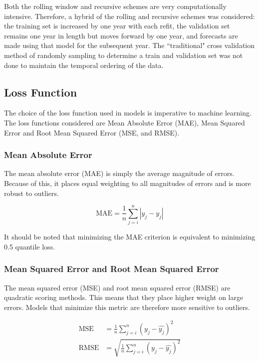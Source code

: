 \documentclass[a4paper, table]{article}
\begin{document}
Both the rolling window and recursive schemes are very computationally intensive. Therefore, a hybrid of the rolling and recursive schemes was considered: the training set is increased by one year with each refit, the validation set remains one year in length but moves forward by one year, and forecasts are made using that model for the subsequent year. The ``traditional" cross validation method of randomly sampling to determine a train and validation set was not done to maintain the temporal ordering of the data.

\subsection{Loss Function}

The choice of the loss function used in models is imperative to machine learning. The loss functions considered are Mean Absolute Error (MAE), Mean Squared Error and Root Mean Squared Error (MSE, and RMSE).

\subsubsection{Mean Absolute Error}

The mean absolute error (MAE) is simply the average magnitude of errors. Because of this, it places equal weighting to all magnitudes of errors and is more robust to outliers. 

\begin{equation}
	\text{MAE} = \frac{1}{n} \sum_{j = i}^{n} |y_j - \hat{y_j}|
\end{equation}

It should be noted that minimizing the MAE criterion is equivalent to minimizing 0.5 quantile loss.

\subsubsection{Mean Squared Error and Root Mean Squared Error}

The mean squared error (MSE) and root mean squared error (RMSE) are quadratic scoring methods. This means that they place higher weight on large errors. Models that minimize this metric are therefore more sensitive to outliers. 

\begin{align}
	\text{MSE} &= \frac{1}{n} \sum_{j = i}^{n} \left( y_j - \hat{y_j}\right) ^2 \\
	\text{RMSE} &= \sqrt{ \frac{1}{n} \sum_{j = i}^{n} \left( y_j - \hat{y_j}\right) ^2}
\end{align}
\end{document}

